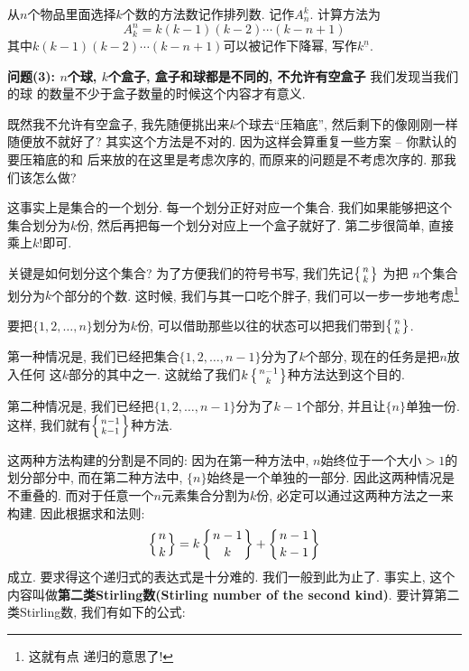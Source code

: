 \begin{definition}[排列数]
    从$n$个物品里面选择$k$个数的方法数记作排列数. 记作$A_n^k$. 计算方法为
    $$
        A_k^n = k(k-1)(k-2)\cdots(k-n+1)
    $$
    其中$k(k-1)(k-2)\cdots(k-n+1)$可以被记作下降幂, 写作$k^{\underline n}$.
\end{definition}

\textbf{问题(3): $n$个球, $k$个盒子, 盒子和球都是不同的, 不允许有空盒子} 我们发现当我们的球
的数量不少于盒子数量的时候这个内容才有意义.

既然我不允许有空盒子, 我先随便挑出来$k$个球去``压箱底'', 然后剩下的像刚刚一样
随便放不就好了? 其实这个方法是不对的. 因为这样会算重复一些方案 -- 你默认的要压箱底的和
后来放的在这里是考虑次序的, 而原来的问题是不考虑次序的. 那我们该怎么做?

这事实上是集合的一个划分. 每一个划分正好对应一个集合. 我们如果能够把这个集合划分为$k$份,
然后再把每一个划分对应上一个盒子就好了. 第二步很简单, 直接乘上$k!$即可.

关键是如何划分这个集合? 为了方便我们的符号书写, 我们先记$\left\{{n \atop k}\right\}$ 为把
$n$个集合划分为$k$个部分的个数. 这时候, 我们与其一口吃个胖子, 我们可以一步一步地考虑\footnote{这就有点
    递归的意思了!  }

要把$\{1,2,\ldots,n\}$划分为$k$份, 可以借助那些以往的状态可以把我们带到$\left\{{n \atop k}\right\}$.

第一种情况是, 我们已经把集合$\{1,2,\ldots,{n-1}\}$分为了$k$个部分, 现在的任务是把$n$放入任何
这$k$部分的其中之一. 这就给了我们$k\left\{{n-1 \atop k}\right\}$种方法达到这个目的.

第二种情况是, 我们已经把$\{1,2,\ldots,{n-1}\}$分为了$k-1$个部分, 并且让$\{n\}$单独一份.
这样, 我们就有$\left\{{n-1 \atop k-1}\right\}$种方法.

这两种方法构建的分割是不同的: 因为在第一种方法中, $n$始终位于一个大小$>1$的划分部分中,
而在第二种方法中, $\{n\}$始终是一个单独的一部分. 因此这两种情况是不重叠的.
而对于任意一个$n$元素集合分割为$k$份, 必定可以通过这两种方法之一来构建. 因此根据求和法则:
$$
    \left\{{n \atop k}\right\}=k\left\{{n-1 \atop k}\right\}+\left\{{n-1 \atop k-1}\right\}
$$
成立.
要求得这个递归式的表达式是十分难的. 我们一般到此为止了. 事实上, 这个内容叫做{\textbf{第二类Stirling数(Stirling number of the second kind)}}.
要计算第二类Stirling数, 我们有如下的公式:


